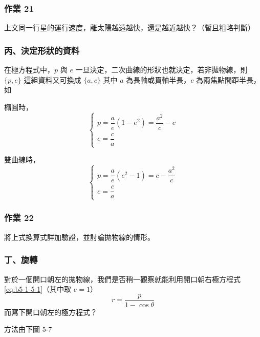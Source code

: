 \subsubsection*{作業 21}
上文同一行星的運行速度，離太陽越遠越快，還是越近越快？（暫且粗略判斷）

\subsubsection*{丙、決定形狀的資料}

在極方程式中，$p$ 與 $e$ 一旦決定，二次曲線的形狀也就決定，若非拋物線，則 $\{p, e\}$ 這組資料又可換成 $\{a, c\}$ 其中 $a$ 為長軸或貫軸半長，$c$ 為兩焦點間距半長，如

橢圓時，
\[
  \begin{cases}
    p = \dfrac{a}{e}(1 - e^2) = \dfrac{a^2}{c} - c \\[0.8em]
    e = \dfrac{c}{a}
  \end{cases}
\]

雙曲線時，
\[
  \begin{cases}
    p = \dfrac{a}{e}(e^2 - 1) = c - \dfrac{a^2}{c} \\[0.8em]
    e = \dfrac{c}{a}
  \end{cases}
\]

\subsubsection*{作業 22}
將上式換算式詳加驗證，並討論拋物線的情形。

\subsubsection*{丁、旋轉}

對於一個開口朝左的拋物線，我們是否稍一觀察就能利用開口朝右極方程式 \eqref{eq:b5-1-5-1}（其中取 $e = 1$）
\[
  r = \frac{p}{1 - \cos\theta}
\]
而寫下開口朝左的極方程式？

方法由下圖 5-7

